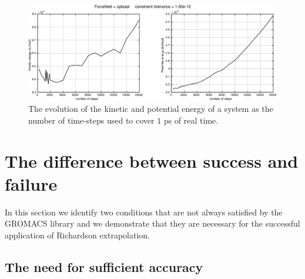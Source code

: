\documentclass[runningheads]{llncs}
\begin{document}
\begin{figure}
  \centering
  \includegraphics[width=\linewidth]{oplsaaltol12.pdf}
   \caption{The evolution of the kinetic and potential energy of a system as the number of time-steps used to cover $1$ ps of real time.} \label{fig:oplsaaltol12}
\end{figure}


\section{The difference between success and failure}

In this section we identify two conditions that are not always satisfied by the GROMACS library and we demonstrate that they are necessary for the successful application of Richardson extrapolation.

\subsection{The need for sufficient accuracy}
\end{document}
